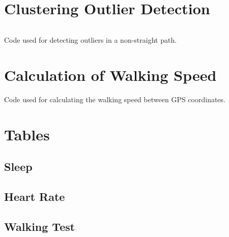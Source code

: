 \newpage

\section{Clustering Outlier Detection}
%
\begin{code}
	\inputminted[firstline=17, lastline=104, linenos=true, fontsize=\footnotesize, breaklines=true]{python}{code/ms-analysis/Clustering.py}
	\caption{Code used for detecting outliers in a non-straight path.}
	\label{GPS Smoothing Code Non-Straight Line}
\end{code}
%

\newpage

\section{Calculation of Walking Speed}
%
\begin{code}
	
	\caption{Code used for calculating the walking speed between GPS coordinates.}
	\label{walk test code snippet}
\end{code}
%


\section{Tables}
\subsection{Sleep}

\subsection{Heart Rate}

\subsection{Walking Test}



